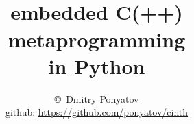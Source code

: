 

\title{\ \\embedded C(++) \\metaprogramming \\in Python}

\author{\copyright\ Dmitry Ponyatov \\
github: \url{https://github.com/ponyatov/cinth}}



\maketitle

\tableofcontents

\secdown






